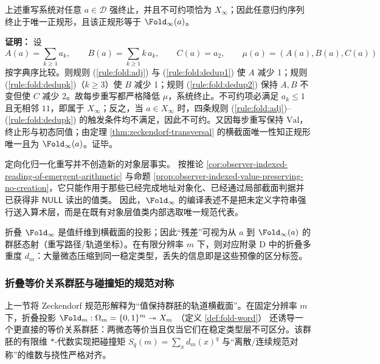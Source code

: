 \begin{proposition}[终止性与唯一正规形]\label{prop:directed-rewrite-termination}
上述重写系统对任意 $a\in\mathcal{D}$ 强终止，并且不可约项恰为 $X_\infty$；因此任意归约序列终止于唯一正规形，且该正规形等于 $\Fold_\infty(a)$。
\end{proposition}

\textbf{证明：}
设
\[
A(a)=\sum_{k\ge 1} a_k,\qquad
B(a)=\sum_{k\ge 1} k\,a_k,\qquad
C(a)=a_2,
\qquad
\mu(a)=(A(a),B(a),C(a))
\]
按字典序比较。则规则 (\ref{rule:fold:adj}) 与 (\ref{rule:fold:dedup1}) 使 $A$ 减少 1；规则 (\ref{rule:fold:dedupk})（$k\ge 3$）使 $B$ 减少 1；规则 (\ref{rule:fold:dedup2}) 保持 $A,B$ 不变但使 $C$ 减少 2。故每步重写都严格降低 $\mu$，系统终止。不可约项必满足 $a_k\le 1$ 且无相邻 $11$，即属于 $X_\infty$；反之，当 $a\in X_\infty$ 时，四条规则 (\ref{rule:fold:adj})--(\ref{rule:fold:dedupk}) 的触发条件均不满足，因此不可约。又因每步重写保持 $\mathrm{Val}$，终止形与初态同值；由定理 \ref{thm:zeckendorf-transversal} 的横截面唯一性知正规形唯一且为 $\Fold_\infty(a)$。证毕。

\begin{remark}\label{rem:directed-rewrite-forcing-interface}
定向化归一化重写并不创造新的对象层事实。
按推论 \ref{cor:observer-indexed-reading-of-emergent-arithmetic} 与命题 \ref{prop:observer-indexed-value-preserving-no-creation}，它只能作用于那些已经完成地址对象化、已经通过局部截面判据并已获得非 \(\mathsf{NULL}\) 读出的值类。
因此，\(\Fold_\infty\) 的编译表述不是把未定义字符串强行送入算术层，而是在既有对象层值类内部选取唯一规范代表。
\end{remark}

\begin{remark}[残差的两种自然落点]\label{rem:residual}
折叠 $\Fold_\infty$ 是值纤维到横截面的投影；因此“残差”可视为从 $a$ 到 $\Fold_\infty(a)$ 的群胚态射（重写路径/轨道坐标）。在有限分辨率 $m$ 下，则对应附录 D 中的折叠多重度 $d_m$：大量微态压缩到同一稳定类型，丢失的信息即是这些预像的区分标签。
\end{remark}



\subsubsection{折叠等价关系群胚与碰撞矩的规范对称}\label{subsubsec:groupoid-fold-collision-gauge}
上一节将 Zeckendorf 规范形解释为“值保持群胚的轨道横截面”。在固定分辨率 \(m\) 下，折叠投影
\(\Fold_m:\Omega_m=\{0,1\}^m\twoheadrightarrow X_m\)
（定义 \ref{def:fold-word}）
还诱导一个更直接的等价关系群胚：两微态等价当且仅当它们在稳定类型层不可区分。该群胚的有限维 \(\ast\)-代数实现把碰撞矩 \(S_q(m)=\sum_x d_m(x)^q\) 与“离散/连续规范对称”的维数与挠性严格对齐。

